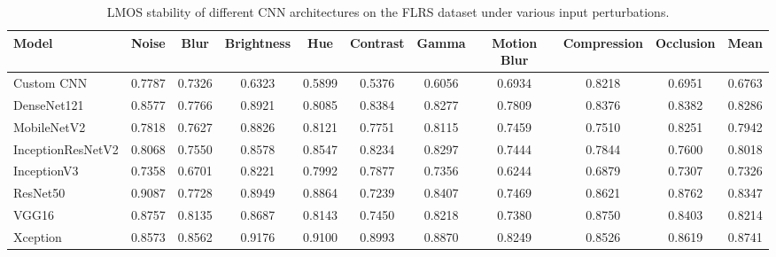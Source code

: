 \documentclass[a4paper,fleqn]{cas-dc}
\begin{document}
\begin{table}[t]
\centering
\caption{LMOS stability of different CNN architectures on the FLRS dataset under various input perturbations.}
\label{tab:lmos_stability_tf_flowers}

\scriptsize
\setlength{\tabcolsep}{3pt}
\renewcommand{\arraystretch}{1.1}

\begin{tabular}{|l|ccccccccc|c|}
\hline
\textbf{Model} &
\textbf{Noise} &
\textbf{Blur} &
\textbf{Brightness} &
\textbf{Hue} &
\textbf{Contrast} &
\textbf{Gamma} &
\textbf{Motion Blur} &
\textbf{Compression} &
\textbf{Occlusion} &
\textbf{Mean} \\
\hline

Custom CNN
&0.7787&0.7326&0.6323&0.5899&0.5376&0.6056&0.6934&0.8218&0.6951&0.6763\\

DenseNet121
&0.8577&0.7766&0.8921&0.8085&0.8384&0.8277&0.7809&0.8376&0.8382&0.8286\\

MobileNetV2
&0.7818&0.7627&0.8826&0.8121&0.7751&0.8115&0.7459&0.7510&0.8251&0.7942\\

InceptionResNetV2
&0.8068&0.7550&0.8578&0.8547&0.8234&0.8297&0.7444&0.7844&0.7600&0.8018\\

InceptionV3
&0.7358&0.6701&0.8221&0.7992&0.7877&0.7356&0.6244&0.6879&0.7307&0.7326\\

ResNet50
&0.9087&0.7728&0.8949&0.8864&0.7239&0.8407&0.7469&0.8621&0.8762&0.8347\\

VGG16
&0.8757&0.8135&0.8687&0.8143&0.7450&0.8218&0.7380&0.8750&0.8403&0.8214\\

Xception
&0.8573&0.8562&0.9176&0.9100&0.8993&0.8870&0.8249&0.8526&0.8619&0.8741\\

\hline
\end{tabular}
\end{table}
\end{document}
